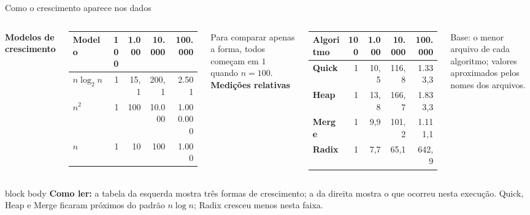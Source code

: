 \documentclass[aspectratio=169,11pt]{beamer}
\begin{document}
\begin{frame}{Como o crescimento aparece nos dados}
  \scriptsize
  \begin{columns}[T,onlytextwidth]
      \textbf{Modelos de crescimento}
      \begin{tabularx}{\linewidth}{>{\bfseries}l r r r r}
        \toprule
        Modelo & 100 & 1.000 & 10.000 & 100.000 \\
        \midrule
        \(n\log_2 n\) & 1 & 15,1 & 200,1 & 2.501 \\
        \(n^2\) & 1 & 100 & 10.000 & 1.000.000 \\
        \(n\) & 1 & 10 & 100 & 1.000 \\
        \bottomrule
      \end{tabularx}
      \vspace{.35em}
      \tiny Para comparar apenas a forma, todos começam em \(1\) quando \(n=100\).
      \textbf{Medições relativas}
      \begin{tabularx}{\linewidth}{>{\bfseries}l r r r r}
        \toprule
        Algoritmo & 100 & 1.000 & 10.000 & 100.000 \\
        \midrule
        Quick & 1 & 10,5 & 116,8 & 1.333,3 \\
        Heap & 1 & 13,8 & 166,7 & 1.833,3 \\
        Merge & 1 & 9,9 & 101,2 & 1.111,1 \\
        Radix & 1 & 7,7 & 65,1 & 642,9 \\
        \bottomrule
      \end{tabularx}
      \vspace{.35em}
      \tiny Base: o menor arquivo de cada algoritmo; valores aproximados pelos nomes dos arquivos.
  \end{columns}
  \vspace{.5em}
  \begin{beamercolorbox}[wd=\linewidth,sep=.55em]{block body}
    \textbf{Como ler:} a tabela da esquerda mostra três formas de crescimento; a da direita mostra o que ocorreu nesta execução. Quick, Heap e Merge ficaram próximos do padrão \(n\log n\); Radix cresceu menos nesta faixa.
  \end{beamercolorbox}
\end{frame}
\end{document}
